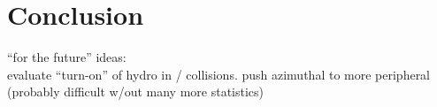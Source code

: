 \chapter{Conclusion}
\label{ch:conclusion}

``for the future'' ideas:\\
evaluate ``turn-on'' of hydro in \pPb / \pp collisions.
push azimuthal to more peripheral (probably difficult w/out many more statistics)
